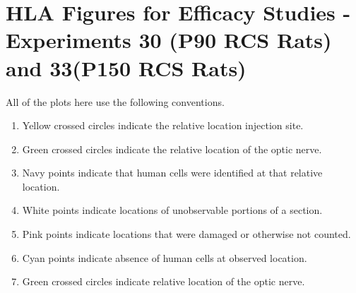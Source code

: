 \documentclass{article}
\begin{document}
\section{HLA Figures for Efficacy Studies - Experiments 30 (P90 RCS Rats) and 33(P150 RCS Rats)}
All of the plots here use the following conventions. 
\begin{enumerate}
\item Yellow crossed circles indicate the relative location injection site.
\item Green crossed circles indicate the relative location of the optic nerve.
\item Navy points indicate that human cells were identified at that relative location.
\item White points indicate locations of unobservable portions of a section.
\item Pink points indicate locations that were damaged or otherwise not counted.
\item Cyan points indicate absence of human cells at observed location.
\item Green crossed circles indicate relative location of the optic nerve.
\end{enumerate}
\end{document}
